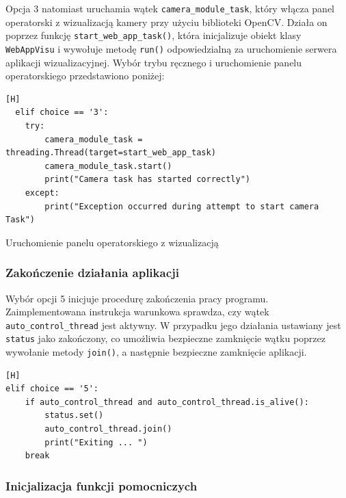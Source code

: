 Opcja 3 natomiast uruchamia wątek \texttt{camera\_module\_task}, który włącza panel operatorski z wizualizacją kamery przy użyciu biblioteki OpenCV. Działa on poprzez funkcję \texttt{start\_web\_app\_task()}, która inicjalizuje obiekt klasy \texttt{WebAppVisu} i wywołuje metodę \texttt{run()} odpowiedzialną za uruchomienie serwera aplikacji wizualizacyjnej. Wybór trybu ręcznego i uruchomienie panelu operatorskiego przedstawiono poniżej:

\vspace*{0.5cm}


\begin{lstlisting}[caption=Uruchomienie panelu operatorskiego z wizualizacją,   label=fig:panel_task, captionpos=b][H]
  elif choice == '3':
    try:
        camera_module_task = threading.Thread(target=start_web_app_task)
        camera_module_task.start()
        print("Camera task has started correctly")
    except:
        print("Exception occurred during attempt to start camera Task")
  \end{lstlisting}
\caption{Uruchomienie panelu operatorskiego z wizualizacją}

\vspace*{0.5cm}


\subsubsection{Zakończenie działania aplikacji}

Wybór opcji 5 inicjuje procedurę zakończenia pracy programu. Zaimplementowana instrukcja warunkowa sprawdza, czy wątek \texttt{auto\_control\_thread} jest aktywny. W przypadku jego działania ustawiany jest \texttt{status} jako zakończony, co umożliwia bezpieczne zamknięcie wątku poprzez wywołanie metody \texttt{join()}, a następnie bezpieczne zamknięcie aplikacji.

\vspace*{0.5cm}


\begin{lstlisting}[caption=Kod zamykający wątki i kończący działanie aplikacji, label=fig:app_exit, captionpos=b][H]
elif choice == '5':
    if auto_control_thread and auto_control_thread.is_alive():
        status.set()
        auto_control_thread.join()
        print("Exiting ... ")
    break
\end{lstlisting}

\subsubsection{Inicjalizacja funkcji pomocniczych}
 
